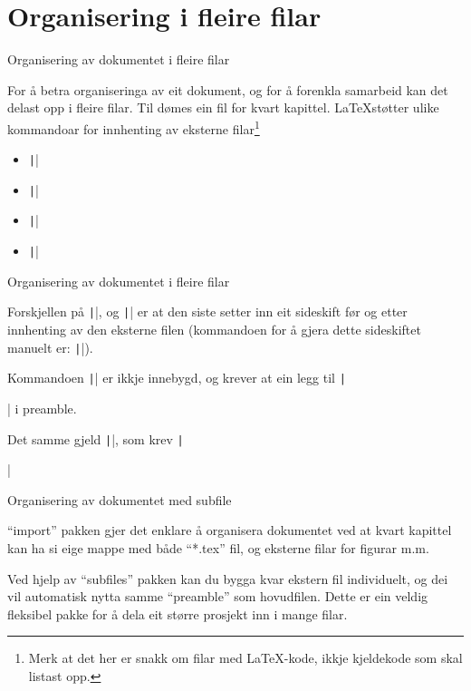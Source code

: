 
\section{Organisering i fleire filar}

	\begin{frame}{Organisering av dokumentet i fleire filar}
	
	For å betra organiseringa av eit dokument, og for å forenkla samarbeid kan det delast opp i fleire filar. Til dømes ein fil for kvart kapittel. \LaTeX støtter ulike kommandoar for innhenting av eksterne filar\footnote{Merk at det her er snakk om filar med \LaTeX-kode, ikkje kjeldekode som skal listast opp.}
	
	\begin{itemize}
		\item \texttt||
		\item \texttt||
		\item \texttt||
		\item \texttt||
	\end{itemize}
	
\end{frame}

\begin{frame}{Organisering av dokumentet i fleire filar}
	
	Forskjellen på \texttt||, og \texttt|| er at den siste setter inn eit sideskift før og etter innhenting av den eksterne filen (kommandoen for å gjera dette sideskiftet manuelt er: \texttt|\clearpage|).
	
	Kommandoen \texttt|| er ikkje innebygd, og krever at ein legg til \texttt|\usepackage{import}| i preamble.
	
	Det samme gjeld \texttt||, som krev \texttt|\usepackage{subfiles}|
	
	
\end{frame}

\begin{frame}{Organisering av dokumentet med subfile}

``import'' pakken gjer det enklare å organisera dokumentet ved at kvart kapittel kan ha si eige mappe med både ``*.tex'' fil, og eksterne filar for figurar m.m.
  
	Ved hjelp av ``subfiles'' pakken kan du bygga kvar ekstern fil individuelt, og dei vil automatisk nytta samme ``preamble'' som hovudfilen. Dette er ein veldig fleksibel pakke for å dela eit større prosjekt inn i mange filar.
	
\end{frame}
